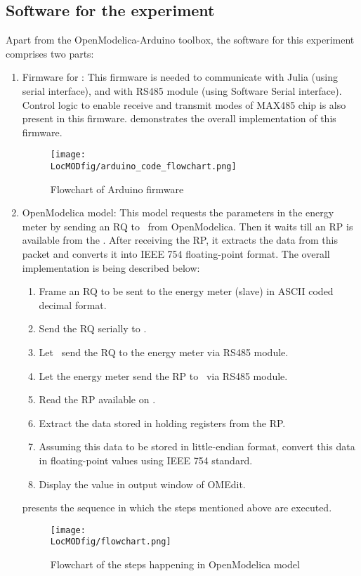 \subsection{Software for the experiment}
Apart from the OpenModelica-Arduino toolbox, the software for this experiment comprises two parts:
\begin{enumerate}
\item  Firmware for \arduino: This firmware is needed to communicate
with Julia (using serial interface), and with RS485 module (using
Software Serial interface). Control logic to enable receive and
transmit modes of MAX485 chip is also present in this firmware.  demonstrates the overall implementation of this firmware.

\begin{figure}
  \centering
  \texttt{[image: \\LocMODfig/arduino\_code\_flowchart.png]}
  \caption{Flowchart of Arduino firmware}
  \label{fig:modbus-firmware}
\end{figure}

\item OpenModelica model: This model requests the parameters in the energy meter
by sending an RQ to \arduino\ from OpenModelica. Then it waits till
an RP is available from the \arduino. After receiving the RP, it extracts 
the data from this packet and converts it into IEEE
754 floating-point format. The overall implementation is being
described below:
\begin {enumerate}
\item Frame an RQ to be sent to the energy meter (slave) in ASCII coded decimal
format. 
\item Send the RQ serially to \arduino. 
\item Let \arduino\ send the RQ to the energy meter via RS485 module. 
\item Let the energy meter send the RP to \arduino\ via RS485 module. 
\item Read the RP available on \arduino. 
\item Extract the data stored in holding registers from the RP. 
\item Assuming this data to be stored in little-endian format, 
convert this data in floating-point values using IEEE 754 standard. 
\item Display the value in output window of OMEdit. 
\end{enumerate}
 presents the sequence in which the steps mentioned above are executed. 
\begin{figure}
  \centering
  \texttt{[image: \\LocMODfig/flowchart.png]}
  \caption{Flowchart of the steps happening in OpenModelica model}
  \label{fig:flow-chart}
\end{figure}
\end{enumerate}


